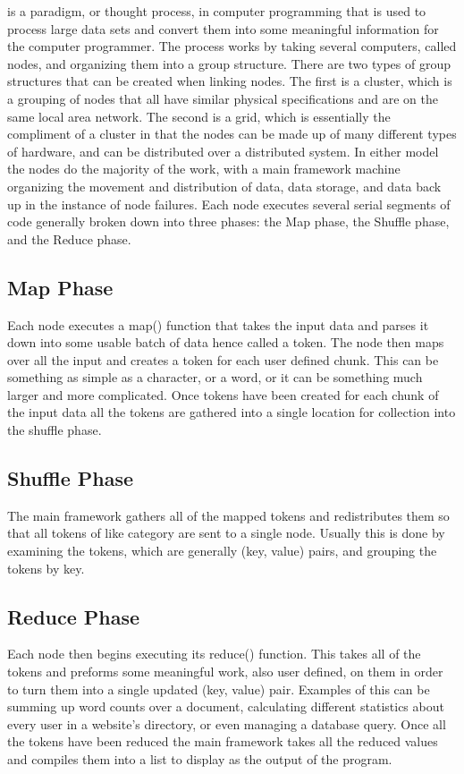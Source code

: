 \documentclass[report]{IEEEtran}
\begin{document}
 is a paradigm, or thought process, in computer programming that is used to process large data sets and convert them into some meaningful information for the computer programmer. The process works by taking several computers, called nodes, and organizing them into a group structure. There are two types of group structures that can be created when linking nodes. The first is a cluster, which is a grouping of nodes that all have similar physical specifications and are on the same local area network. The second is a grid, which is essentially the compliment of a cluster in that the nodes can be made up of many different types of hardware, and can be distributed over a distributed system.
In either model the nodes do the majority of the work, with a main framework machine organizing the movement and distribution of data, data storage, and data back up in the instance of node failures. Each node executes several serial segments of code generally broken down into three phases: the Map phase, the Shuffle phase, and the Reduce phase.

\subsection{Map Phase}
Each node executes a map() function that takes the input data and parses it down into some usable batch of data hence called a token. The node then maps over all the input and creates a token for each user defined chunk. This can be something as simple as a character, or a word, or it can be something much larger and more complicated. Once tokens have been created for each chunk of the input data all the tokens are gathered into a single location for collection into the shuffle phase.

\subsection{Shuffle Phase}
The main framework gathers all of the mapped tokens and redistributes them so that all tokens of like category are sent to a single node. Usually this is done by examining the tokens, which are generally (key, value) pairs, and grouping the tokens by key.

\subsection{Reduce Phase}
Each node then begins executing its reduce() function. This takes all of the tokens and preforms some meaningful work, also user defined, on them in order to turn them into a single updated (key, value) pair. Examples of this can be summing up word counts over a document, calculating different statistics about every user in a website's directory, or even managing a database query. Once all the tokens have been reduced the main framework takes all the reduced values and compiles them into a list to display as the output of the program.
\end{document}
